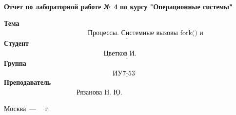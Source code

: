 \begin{titlepage}
	
	\begin{center}
		\Large\textbf{Отчет по лабораторной работе № 4}\newline
		\Large\textbf {по курсу "Операционные системы"}\newline
	\end{center}
	
	\noindent\textbf{Тема} $\underline{\text{~~~~~~~~~~~~~~~~~~~~~~~~~~~~~~~~~~~~~Процессы. Системные вызовы fork() и exec()~~~~~~~~~~~~~~~~~~~~~~~~~}}$\newline\newline\newline\newline\newline
	\noindent\textbf{Студент} $\underline{\text{~~~~~~~~~~~~~~~~~~~~~~~~~~~~~~~~~~~~~~~~~~~~Цветков И. А.~~~~~~~~~~~~~~~~~~~~~~~~~~~~~~~~~~~~~~~~~~~~~~~~~}}$\newline\newline
	\noindent\textbf{Группа} $\underline{\text{~~~~~~~~~~~~~~~~~~~~~~~~~~~~~~~~~~~~~~~~~~~~~~~~ИУ7-53 Б~~~~~~~~~~~~~~~~~~~~~~~~~~~~~~~~~~~~~~~~~~~~~~~~~~~~~}}$\newline\newline
	\noindent\textbf{Преподаватель} $\underline{\text{~~~~~~~~~~~~~~~~~~~~~~~~~~~~~~~~Рязанова Н. Ю.~~~~~~~~~~~~~~~~~~~~~~~~~~~~~~~~~~~~~~~~~~~~~~~~}}$\newline
	

	\begin{center}
		\vfill
		Москва~---~\the\year
		~г.
	\end{center}
	\restoregeometry
\end{titlepage}
